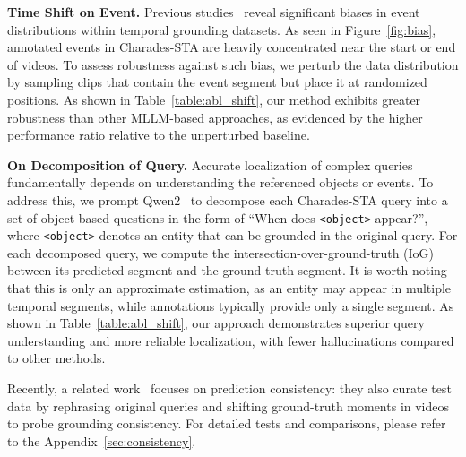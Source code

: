 \noindent \textbf{Time Shift on Event.}
Previous studies~\cite{hao2022can, otani2020uncovering} reveal significant biases in event distributions within temporal grounding datasets. As seen in Figure~\ref{fig:bias}, annotated events in Charades-STA are heavily concentrated near the start or end of videos.
To assess robustness against such bias, we perturb the data distribution by sampling clips that contain the event segment but place it at randomized positions.
As shown in Table~\ref{table:abl_shift}, our method exhibits greater robustness than other MLLM-based approaches, as evidenced by the higher performance ratio relative to the unperturbed baseline.

\noindent \textbf{On Decomposition of Query.}
Accurate localization of complex queries fundamentally depends on understanding the referenced objects or events.
To address this, we prompt Qwen2~\cite{qwen2} to decompose each Charades-STA query into a set of object-based questions in the form of ``When does \texttt{<object>} appear?'', where \texttt{<object>} denotes an entity that can be grounded in the original query.
For each decomposed query, we compute the intersection-over-ground-truth (IoG) between its predicted segment and the ground-truth segment.
It is worth noting that this is only an approximate estimation, as an entity may appear in multiple temporal segments, while annotations typically provide only a single segment.
As shown in Table~\ref{table:abl_shift}, our approach demonstrates superior query understanding and more reliable localization, with fewer hallucinations compared to other methods.

Recently, a related work~\cite{jung2025consistency} focuses on prediction consistency: they also curate test data by rephrasing original queries and shifting ground-truth moments in videos to probe grounding consistency. For detailed tests and comparisons, please refer to the Appendix~\ref{sec:consistency}.

